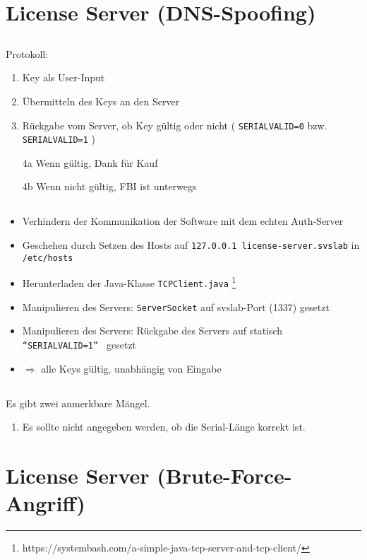 \documentclass[twoside]{article}
\newcommand{\say}[1]{%
	``#1''%
}
\newcommand{\ttt}[1]{%
	\texttt{#1}%
}
\begin{document}
\section{License Server (DNS-Spoofing)}
\subsection{}
Protokoll:
\begin{enumerate}
	\item Key als User-Input
	\item Übermitteln des Keys an den Server
	\item Rückgabe vom Server, ob Key gültig oder nicht (\ttt{SERIAL\textunderscore VALID=0} bzw. \ttt{SERIAL\textunderscore VALID=1})
	\item[4a] Wenn gültig, Dank für Kauf
	\item[4b] Wenn nicht gültig, FBI ist unterwegs
\end{enumerate}
\subsection{}
\begin{itemize}
	\item Verhindern der Kommunikation der Software mit dem echten Auth-Server
	\item Geschehen durch Setzen des Hosts auf \ttt{127.0.0.1    license-server.svslab} in \ttt{/etc/hosts}
	\item Herunterladen der Java-Klasse \ttt{TCPClient.java}\footnote{https://systembash.com/a-simple-java-tcp-server-and-tcp-client/}
	\item Manipulieren des Servers: \ttt{ServerSocket} auf svslab-Port (1337) gesetzt
	\item Manipulieren des Servers: Rückgabe des Servers auf statisch \ttt{\say{SERIAL\textunderscore VALID=1}} gesetzt
	\item $\Longrightarrow$ alle Keys gültig, unabhängig von Eingabe
\end{itemize} 
\subsection{}
Es gibt zwei anmerkbare Mängel.
\begin{enumerate}
	\item Es sollte nicht angegeben werden, ob die Serial-Länge korrekt ist.
\end{enumerate}


\section{License Server (Brute-Force-Angriff)}
\end{document}
